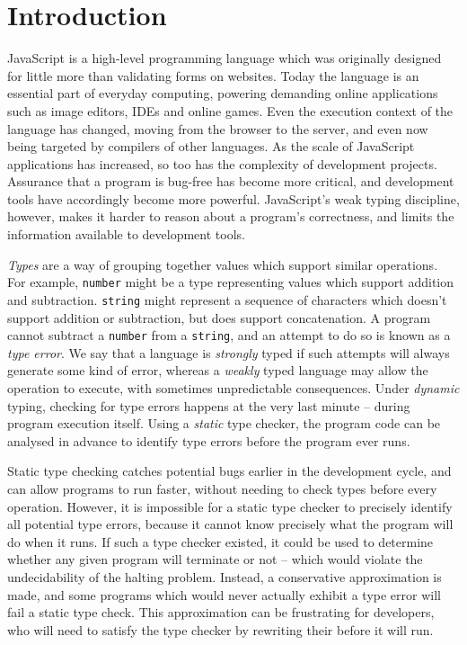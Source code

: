 \documentclass[12pt,a4paper,twoside,openright]{report}
\begin{document}
\chapter{Introduction}\label{introduction}

JavaScript is a high-level programming language which was originally designed
for little more than validating forms on websites. Today the language is an
essential part of everyday computing, powering demanding online applications
such as image editors, IDEs and online games. Even the execution context of the
language has changed, moving from the browser to the server, and even now being
targeted by compilers of other languages. As the scale of JavaScript
applications has increased, so too has the complexity of development projects.
Assurance that a program is bug-free has become more critical, and development
tools have accordingly become more powerful. JavaScript's weak typing
discipline, however, makes it harder to reason about a program's correctness,
and limits the information available to development tools.

\textit{Types} are a way of grouping together values which support similar
operations. For example, \texttt{number} might be a type representing values
which support addition and subtraction. \texttt{string} might represent a
sequence of characters which doesn't support addition or subtraction, but does
support concatenation. A program cannot subtract a \texttt{number} from a
\texttt{string}, and an attempt to do so is known as a \textit{type error}. We
say that a language is \textit{strongly} typed if such attempts will always
generate some kind of error, whereas a \textit{weakly} typed language may allow
the operation to execute, with sometimes unpredictable consequences. Under
\textit{dynamic} typing, checking for type errors happens at the very last
minute -- during program execution itself. Using a \textit{static} type %
checker, the program code can be analysed in advance to identify type errors
before the program ever runs.

Static type checking catches potential bugs earlier in the development cycle,
and can allow programs to run faster, without needing to check types before
every operation. However, it is impossible for a static type checker to
precisely identify all potential type errors, because it cannot know precisely
what the program will do when it runs. If such a type checker existed, it could
be used to determine whether any given program will terminate or not -- which %
would violate the undecidability of the halting problem. Instead, a
conservative approximation is made, and some programs which would never
actually exhibit a type error will fail a static type check. This approximation
can be frustrating for developers, who will need to satisfy the type checker by
rewriting their before it will run.
\end{document}
